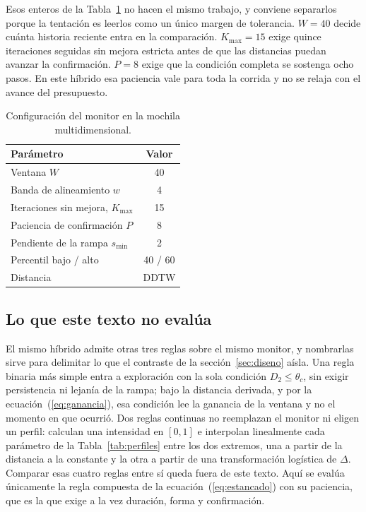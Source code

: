 \documentclass[runningheads]{llncs}
\begin{document}
Esos enteros de la Tabla~\ref{tab:monitor} no hacen el mismo trabajo, y conviene separarlos porque la tentación es leerlos como un único margen de tolerancia. $W = 40$ decide cuánta historia reciente entra en la comparación. $K_{\max} = 15$ exige quince iteraciones seguidas sin mejora estricta antes de que las distancias puedan avanzar la confirmación. $P = 8$ exige que la condición completa se sostenga ocho pasos. En este híbrido esa paciencia vale para toda la corrida y no se relaja con el avance del presupuesto.

\begin{table}
\caption{Configuración del monitor en la mochila multidimensional.}
\label{tab:monitor}
\begin{tabular}{lc}
\toprule
Parámetro & Valor \\
\midrule
Ventana $W$ & 40 \\
Banda de alineamiento $w$ & 4 \\
Iteraciones sin mejora, $K_{\max}$ & 15 \\
Paciencia de confirmación $P$ & 8 \\
Pendiente de la rampa $s_{\min}$ & 2 \\
Percentil bajo / alto & 40 / 60 \\
Distancia & DDTW \\
\bottomrule
\end{tabular}
\end{table}

\subsection{Lo que este texto no evalúa}
\label{sec:no_evalua}

El mismo híbrido admite otras tres reglas sobre el mismo monitor, y nombrarlas sirve para delimitar lo que el contraste de la sección~\ref{sec:diseno} aísla. Una regla binaria más simple entra a exploración con la sola condición $D_2 \le \theta_c$, sin exigir persistencia ni lejanía de la rampa; bajo la distancia derivada, y por la ecuación~(\ref{eq:ganancia}), esa condición lee la ganancia de la ventana y no el momento en que ocurrió. Dos reglas continuas no reemplazan el monitor ni eligen un perfil: calculan una intensidad en $[0,1]$ e interpolan linealmente cada parámetro de la Tabla~\ref{tab:perfiles} entre los dos extremos, una a partir de la distancia a la constante y la otra a partir de una transformación logística de $\Delta$. Comparar esas cuatro reglas entre sí queda fuera de este texto. Aquí se evalúa únicamente la regla compuesta de la ecuación~(\ref{eq:estancado}) con su paciencia, que es la que exige a la vez duración, forma y confirmación.
\end{document}

